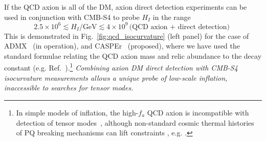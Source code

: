 If the QCD axion is all of the DM, axion direct detection experiments can be used in conjunction with CMB-S4 to probe $H_I$ in the range
\begin{equation}
 2.5\times 10^6\lesssim H_I/\text{GeV}\lesssim 4\times 10^9\, 
\text{(QCD axion + direct detection)}\, \,
\end{equation}
This is demonstrated in Fig.~\ref{fig:qcd_isocurvature} (left panel) for the case of ADMX~\cite{Asztalos:2009yp} (in operation), and CASPEr~\cite{Budker:2013hfa} (proposed), where we have used the standard formulae relating the QCD axion mass and relic abundance to the decay constant (e.g. Ref.~\cite{Fox:2004kb}).\footnote{In simple models of inflation, the high-$f_a$ QCD axion is incompatible with detection of tensor modes~\cite{Fox:2004kb,Hertzberg:2008wr,Visinelli:2014twa,Marsh:2014qoa,Visinelli:2014twa}, although non-standard cosmic thermal histories of PQ breaking mechanisms can lift constraints , e.g. \cite{Higaki:2014ooa,Fairbairn:2014zta,Nomura:2015xil}.} \emph{Combining axion DM direct detection with CMB-S4 isocurvature measurements allows a unique probe of low-scale inflation, inaccessible to searches for tensor modes.}

